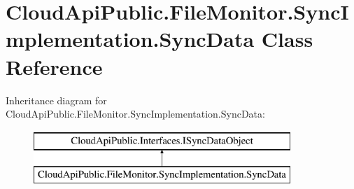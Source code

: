\hypertarget{class_cloud_api_public_1_1_file_monitor_1_1_sync_implementation_1_1_sync_data}{\section{Cloud\-Api\-Public.\-File\-Monitor.\-Sync\-Implementation.\-Sync\-Data Class Reference}
\label{class_cloud_api_public_1_1_file_monitor_1_1_sync_implementation_1_1_sync_data}
}
Inheritance diagram for Cloud\-Api\-Public.\-File\-Monitor.\-Sync\-Implementation.\-Sync\-Data\-:\begin{figure}[H]
\begin{center}
\leavevmode
\includegraphics[height=2.000000cm]{class_cloud_api_public_1_1_file_monitor_1_1_sync_implementation_1_1_sync_data}
\end{center}
\end{figure}
